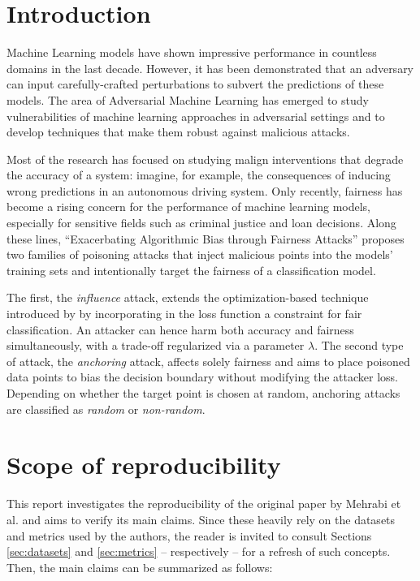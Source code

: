 

\section{Introduction}
Machine Learning models have shown impressive performance in countless domains in the last decade. However, it has been demonstrated that an adversary can input carefully-crafted perturbations to subvert the predictions of these models. The area of Adversarial Machine Learning has emerged to study vulnerabilities of machine learning approaches in adversarial settings and to develop techniques that make them robust against malicious attacks.

Most of the research has focused on studying malign interventions that degrade the accuracy of a system: imagine, for example, the consequences of inducing wrong predictions in an autonomous driving system. Only recently, fairness has become a rising concern for the performance of machine learning models, especially for sensitive fields such as criminal justice and loan decisions. Along these lines, “Exacerbating Algorithmic Bias through Fairness Attacks” \citep{originalpaper} proposes two families of poisoning attacks that inject malicious points into the models’ training sets and intentionally target the fairness of a classification model.

The first, the \textit{influence} attack, extends the optimization-based technique introduced by  by incorporating in the loss function a constraint for fair classification. An attacker can hence harm both accuracy and fairness simultaneously, with a trade-off regularized via a parameter $\lambda$. The second type of attack, the \textit{anchoring} attack, affects solely fairness and aims to place poisoned data points to bias the decision boundary without modifying the attacker loss. Depending on whether the target point is chosen at random, anchoring attacks are classified as \textit{random} or \textit{non-random}.
\section{Scope of reproducibility}
\label{sec:claims}

This report investigates the reproducibility of the original paper by Mehrabi et al. and aims to verify its main claims. Since these heavily rely on the datasets and metrics used by the authors, the reader is invited to consult Sections \ref{sec:datasets} and \ref{sec:metrics} -- respectively -- for a refresh of such concepts. Then, the main claims can be summarized as follows:

